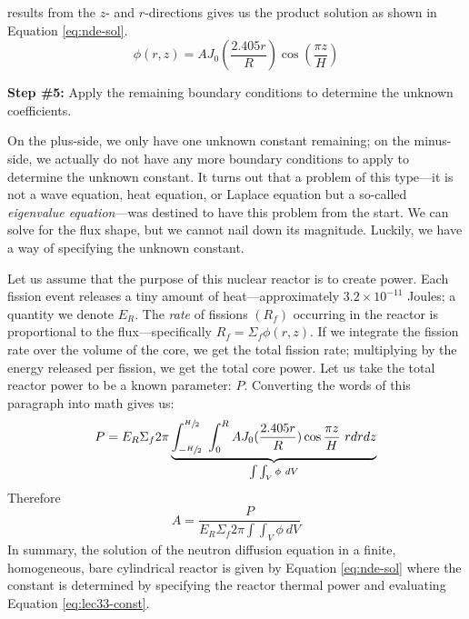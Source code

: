  results from the $z$- and $r$-directions gives us the product solution as shown in Equation \ref{eq:nde-sol}.
\begin{equation}
\phi(r,z) = A J_0(\frac{2.405 r}{R})\cos{(\frac{\pi z}{H})}
\label{eq:nde-sol}
\end{equation}

\vspace{0.25cm}

\noindent\textbf{Step \#5:} Apply the remaining boundary conditions to determine the unknown coefficients.

\vspace{0.25cm}

\noindent On the plus-side, we only have one unknown constant remaining; on the minus-side, we actually do not have any more boundary conditions to apply to determine the unknown constant.  It turns out that a problem of this type---it is not a wave equation, heat equation, or Laplace equation but a so-called \emph{eigenvalue equation}---was destined to have this problem from the start.  We can solve for the flux shape, but we cannot nail down its magnitude.  Luckily, we have a way of specifying the unknown constant.

Let us assume that the purpose of this nuclear reactor is to create power.  Each fission event releases a tiny amount of heat---approximately $3.2\times 10^{-11}$ Joules; a quantity we denote $E_R$. The \emph{rate} of fissions $(R_f)$ occurring in the reactor is proportional to the flux---specifically $R_f = \Sigma_f \phi(r,z)$.  If we integrate the fission rate over the volume of the core, we get the total fission rate; multiplying by the energy released per fission, we get the total core power.  Let us take the total reactor power to be a known parameter: $P$.  Converting the words of this paragraph into math gives us:
\begin{equation}
P = E_R \Sigma_f 2 \pi \underbrace{\int_{-\sfrac{H}{2}}^{\sfrac{H}{2}} \ \int_0^R AJ_0(\frac{2.405 r}{R})\cos{\frac{\pi z}{H}} \ r dr dz}_{\int \int_{V} \phi \ dV}
\end{equation}
Therefore
\begin{equation}
A = \frac{P}{E_R \Sigma_f 2\pi \int \int_{V} \phi \ dV}
\label{eq:lec33-const}
\end{equation}
In summary, the solution of the neutron diffusion equation in a finite, homogeneous, bare cylindrical reactor is given by Equation \ref{eq:nde-sol} where the constant is determined by specifying the reactor thermal power and evaluating Equation \ref{eq:lec33-const}.

